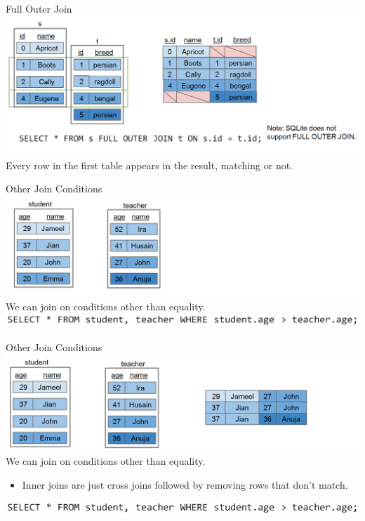 \documentclass[aspectratio=169]{../latex_main/tntbeamer}  %
\begin{document}
	
	
	\begin{frame}{Full Outer Join}
	    \includegraphics[scale=.4]{Bild18}\\
	    Every row in the first table appears in the result, matching or not.
	\end{frame}
	
	
	
	\begin{frame}{Other Join Conditions}
	    \includegraphics[scale=.4]{Bild19}\\
	    We can join on conditions other than equality. \\
	    \includegraphics[scale=.4]{Bild21}
	\end{frame}
	
	
	
	\begin{frame}{Other Join Conditions}
	    \includegraphics[scale=.4]{Bild20}\\
	    We can join on conditions other than equality.
	    \begin{itemize}
	        \item Inner joins are just cross joins followed by removing rows that don’t match. 
	    \end{itemize}
	    \includegraphics[scale=.4]{Bild21}
	\end{frame}
	
\end{document}
